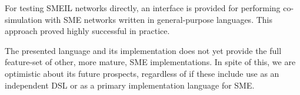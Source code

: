 For testing SMEIL networks directly, an interface is provided for performing
co-simulation with SME networks written in general-purpose languages. This
approach proved highly successful in practice.

The presented language and its implementation does not yet provide the full
feature-set of other, more mature, SME implementations. In spite of this, we are
optimistic about its future prospects, regardless of if these include use as an
independent DSL or as a primary implementation language for SME.

